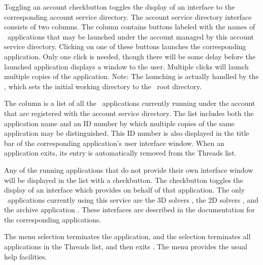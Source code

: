 Toggling an account checkbutton toggles the display of an interface
to the corresponding account service directory.  The account
service directory interface consists of two columns.  The 
 column contains buttons labeled with the names of
\OOMMF\ applications that may be launched under the account managed by
this account service directory.  Clicking on one of these buttons
launches the corresponding application.  Only one click is needed,
though there will be some delay before the launched application
displays a window to the user.  Multiple clicks will launch multiple
copies of the application.  Note: The launching is actually handled by
the , which sets the
initial working directory to the
\OOMMF\ root directory.

The 
column is a list of all the \OOMMF\ applications
currently running under the account that are registered with the
account service directory.  The list includes both the application
name and an ID number by which multiple copies of the same application
may be distinguished.  This ID number is also displayed in the title
bar of the corresponding application's user interface window.  When an
application exits, its entry is automatically removed from the Threads
list.

Any of the running applications that do not provide their own
interface window will be displayed in the  list with a
checkbutton.  The checkbutton toggles the display of an interface
which  provides on behalf of that application.  The only
\OOMMF\ applications currently using this service are
the 3D solvers ,
the 2D solvers , and the archive application
.
These interfaces are described in the documentation for the
corresponding applications.

The menu selection  terminates the 
application, and the  selection terminates
all applications in the Threads list, and then exits .
The menu  provides the usual help facilities.

